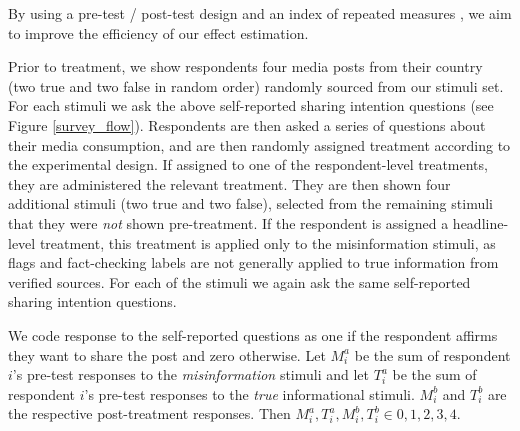\documentclass[letterpaper, 12pt, parskip=full,DIV=10]{scrartcl}
\begin{document}
By using a pre-test / post-test design  \citep{davidian2005semiparametric} %
and an index of repeated measures \citep{broockman2017design}, we aim to improve the efficiency of our effect estimation. 



Prior to treatment, we show respondents four media posts from their country (two true and two false in random order) randomly sourced from our stimuli set. For each stimuli we ask the above self-reported sharing intention questions (see Figure \ref{survey_flow}). Respondents are then asked a series of questions about their media consumption, and are then randomly assigned treatment according to the experimental design. If assigned to one of the respondent-level treatments, they are administered the relevant treatment. They are then shown four additional stimuli (two true and two false), selected from the remaining stimuli that they were \textit{not} shown pre-treatment. If the respondent is assigned a headline-level treatment, this treatment is applied only to the misinformation stimuli, as flags and fact-checking labels are not generally applied to true information from verified sources. For each of the stimuli we again ask the same self-reported sharing intention questions. 



We code response to the self-reported questions as one if the respondent affirms they want to share the post and zero otherwise. Let $M_i^a$ be the sum of respondent $i$'s pre-test responses to the \textit{misinformation} stimuli and let $T_i^a$ be the sum of respondent $i$'s pre-test responses to the \textit{true} informational stimuli. $M_i^b$ and $T_i^b$ are the respective post-treatment responses. Then $M_i^a, T_i^a, M_i^b, T_i^b \in {0,1,2, 3, 4}$. 
\end{document}
